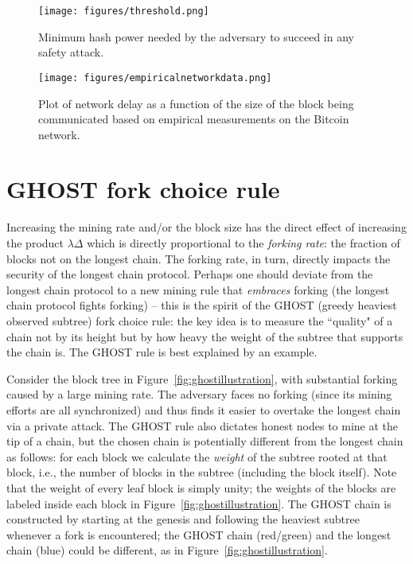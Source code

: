 \documentclass{article}
\begin{document}
\begin{figure}
     \centering
     \texttt{[image: figures/threshold.png]}
   \caption{Minimum hash power needed by the adversary to succeed in any safety attack.  }
   \label{fig:threshold}
 \end{figure}
 
 \begin{figure}
     \centering
     \texttt{[image: figures/empiricalnetworkdata.png]}
   \caption{Plot of network delay as a function of the size of the block being communicated based on empirical measurements on the Bitcoin network. }
   \label{fig:empricalnetworkdata}
 \end{figure}
 
 
 
\section*{{\sf GHOST} fork choice rule}
Increasing the mining rate and/or the block size has the direct effect of increasing the product $\lambda \Delta$ which is directly proportional to the {\em forking rate}: the fraction of blocks not on the longest chain. The forking rate, in turn, directly impacts the security of the longest chain protocol. Perhaps one should deviate from the longest chain protocol to a new mining rule  that {\em embraces} forking (the longest chain protocol fights forking) -- this is the spirit of the {\sf GHOST} (greedy heaviest observed subtree) fork choice rule: the key idea is to measure the ``quality" of a chain not by its height but by how heavy the weight of the subtree that supports the chain is. The {\sf GHOST} rule is best explained by an example. 

Consider the block tree in Figure~\ref{fig:ghostillustration}, with substantial forking caused by a large mining rate. The adversary faces no forking (since its mining efforts are all synchronized) and thus finds it easier to overtake the longest chain via a private attack. The {\sf GHOST} rule also dictates honest nodes to mine at the tip of a chain, but the chosen chain is potentially different from  the longest chain  as follows: for each block we calculate the {\em weight} of the subtree rooted at that
block, i.e., the number of blocks in the subtree (including the block itself). Note that the weight of every leaf block is simply unity; the weights of the blocks are labeled inside each block in Figure~\ref{fig:ghostillustration}. 
The {\sf GHOST} chain is constructed by starting at the genesis and following the heaviest subtree whenever a fork is encountered; the {\sf GHOST} chain (red/green) and the longest chain (blue) could be different, as in Figure~\ref{fig:ghostillustration}. 
\end{document}
